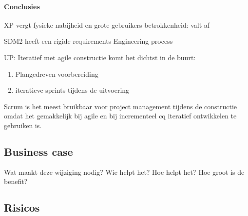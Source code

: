 \documentclass[a4paper,11pt,twoside,draft]{article}
\begin{document}
\paragraph{Conclusies}
\begin{description}
\item XP vergt fysieke nabijheid en grote gebruikers betrokkenheid: valt af
\item SDM2 heeft een rigide requirements Engineering process
\item UP: Iteratief met agile constructie komt het dichtst in de buurt:
\begin{enumerate}
 \item Plangedreven voorbereiding
 \item iteratieve sprints tijdens de uitvoering
\end{enumerate}
\end{description}

Scrum is het meest bruikbaar voor project management tijdens de constructie omdat
het gemakkelijk bij agile en bij incrementeel cq iteratief ontwikkelen te gebruiken is.

\subsection{Business case}

Wat maakt deze wijziging nodig? Wie helpt het? Hoe helpt het?
Hoe groot is de benefit?

\subsection{Risicos}
\end{document}

